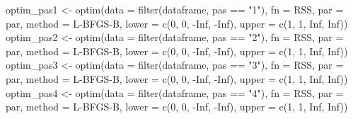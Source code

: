 \documentclass[
]{article}
\newenvironment{Shaded}{\begin{snugshade}}{\end{snugshade}}
\newcommand{\AttributeTok}[1]{\textcolor[rgb]{0.77,0.63,0.00}{#1}}
\newcommand{\ConstantTok}[1]{\textcolor[rgb]{0.00,0.00,0.00}{#1}}
\newcommand{\DecValTok}[1]{\textcolor[rgb]{0.00,0.00,0.81}{#1}}
\newcommand{\FunctionTok}[1]{\textcolor[rgb]{0.00,0.00,0.00}{#1}}
\newcommand{\NormalTok}[1]{#1}
\newcommand{\OtherTok}[1]{\textcolor[rgb]{0.56,0.35,0.01}{#1}}
\newcommand{\SpecialCharTok}[1]{\textcolor[rgb]{0.00,0.00,0.00}{#1}}
\newcommand{\StringTok}[1]{\textcolor[rgb]{0.31,0.60,0.02}{#1}}
\begin{document}
\begin{Shaded}
\begin{Highlighting}[]
\NormalTok{  optim\_pas1 }\OtherTok{\textless{}{-}} \FunctionTok{optim}\NormalTok{(}\AttributeTok{data =} \FunctionTok{filter}\NormalTok{(dataframe, pas }\SpecialCharTok{==} \StringTok{"1"}\NormalTok{), }\AttributeTok{fn =}\NormalTok{ RSS, }\AttributeTok{par =}\NormalTok{ par, }\AttributeTok{method =} \StringTok{\textquotesingle{}L{-}BFGS{-}B\textquotesingle{}}\NormalTok{, }\AttributeTok{lower =} \FunctionTok{c}\NormalTok{(}\DecValTok{0}\NormalTok{, }\DecValTok{0}\NormalTok{, }\SpecialCharTok{{-}}\ConstantTok{Inf}\NormalTok{, }\SpecialCharTok{{-}}\ConstantTok{Inf}\NormalTok{), }\AttributeTok{upper =} \FunctionTok{c}\NormalTok{(}\DecValTok{1}\NormalTok{, }\DecValTok{1}\NormalTok{, }\ConstantTok{Inf}\NormalTok{, }\ConstantTok{Inf}\NormalTok{))}
\NormalTok{  optim\_pas2 }\OtherTok{\textless{}{-}} \FunctionTok{optim}\NormalTok{(}\AttributeTok{data =} \FunctionTok{filter}\NormalTok{(dataframe, pas }\SpecialCharTok{==} \StringTok{"2"}\NormalTok{), }\AttributeTok{fn =}\NormalTok{ RSS, }\AttributeTok{par =}\NormalTok{ par, }\AttributeTok{method =} \StringTok{\textquotesingle{}L{-}BFGS{-}B\textquotesingle{}}\NormalTok{, }\AttributeTok{lower =} \FunctionTok{c}\NormalTok{(}\DecValTok{0}\NormalTok{, }\DecValTok{0}\NormalTok{, }\SpecialCharTok{{-}}\ConstantTok{Inf}\NormalTok{, }\SpecialCharTok{{-}}\ConstantTok{Inf}\NormalTok{), }\AttributeTok{upper =} \FunctionTok{c}\NormalTok{(}\DecValTok{1}\NormalTok{, }\DecValTok{1}\NormalTok{, }\ConstantTok{Inf}\NormalTok{, }\ConstantTok{Inf}\NormalTok{))}
\NormalTok{  optim\_pas3 }\OtherTok{\textless{}{-}} \FunctionTok{optim}\NormalTok{(}\AttributeTok{data =} \FunctionTok{filter}\NormalTok{(dataframe, pas }\SpecialCharTok{==} \StringTok{"3"}\NormalTok{), }\AttributeTok{fn =}\NormalTok{ RSS, }\AttributeTok{par =}\NormalTok{ par, }\AttributeTok{method =} \StringTok{\textquotesingle{}L{-}BFGS{-}B\textquotesingle{}}\NormalTok{, }\AttributeTok{lower =} \FunctionTok{c}\NormalTok{(}\DecValTok{0}\NormalTok{, }\DecValTok{0}\NormalTok{, }\SpecialCharTok{{-}}\ConstantTok{Inf}\NormalTok{, }\SpecialCharTok{{-}}\ConstantTok{Inf}\NormalTok{), }\AttributeTok{upper =} \FunctionTok{c}\NormalTok{(}\DecValTok{1}\NormalTok{, }\DecValTok{1}\NormalTok{, }\ConstantTok{Inf}\NormalTok{, }\ConstantTok{Inf}\NormalTok{))}
\NormalTok{  optim\_pas4 }\OtherTok{\textless{}{-}} \FunctionTok{optim}\NormalTok{(}\AttributeTok{data =} \FunctionTok{filter}\NormalTok{(dataframe, pas }\SpecialCharTok{==} \StringTok{"4"}\NormalTok{), }\AttributeTok{fn =}\NormalTok{ RSS, }\AttributeTok{par =}\NormalTok{ par, }\AttributeTok{method =} \StringTok{\textquotesingle{}L{-}BFGS{-}B\textquotesingle{}}\NormalTok{, }\AttributeTok{lower =} \FunctionTok{c}\NormalTok{(}\DecValTok{0}\NormalTok{, }\DecValTok{0}\NormalTok{, }\SpecialCharTok{{-}}\ConstantTok{Inf}\NormalTok{, }\SpecialCharTok{{-}}\ConstantTok{Inf}\NormalTok{), }\AttributeTok{upper =} \FunctionTok{c}\NormalTok{(}\DecValTok{1}\NormalTok{, }\DecValTok{1}\NormalTok{, }\ConstantTok{Inf}\NormalTok{, }\ConstantTok{Inf}\NormalTok{))}
  

\end{Highlighting}
\end{Shaded}
\end{document}
